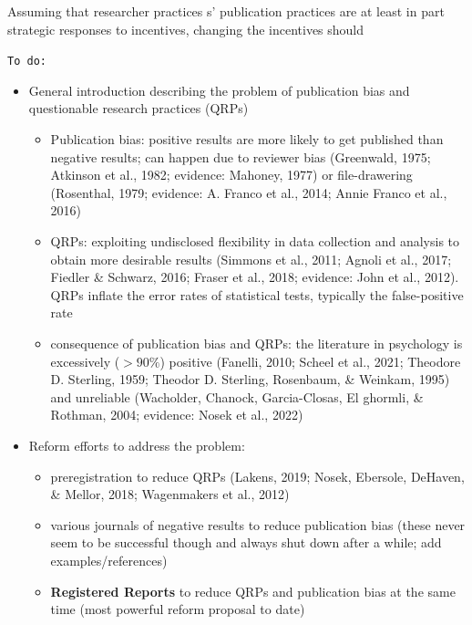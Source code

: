 \documentclass[
  ,man,mask,floatsintext]{apa6}
\providecommand{\tightlist}{%
  \setlength{\itemsep}{0pt}\setlength{\parskip}{0pt}}
\begin{document}
Assuming that researcher practices s' publication practices are at least in part strategic responses to incentives, changing the incentives should

\texttt{To\ do:}

\begin{itemize}
\tightlist
\item
  General introduction describing the problem of publication bias and questionable research practices (QRPs)

  \begin{itemize}
  \tightlist
  \item
    Publication bias: positive results are more likely to get published than negative results; can happen due to reviewer bias (Greenwald, 1975; Atkinson et al., 1982; evidence: Mahoney, 1977) or file-drawering (Rosenthal, 1979; evidence: A. Franco et al., 2014; Annie Franco et al., 2016)
  \item
    QRPs: exploiting undisclosed flexibility in data collection and analysis to obtain more desirable results (Simmons et al., 2011; Agnoli et al., 2017; Fiedler \& Schwarz, 2016; Fraser et al., 2018; evidence: John et al., 2012). QRPs inflate the error rates of statistical tests, typically the false-positive rate
  \item
    consequence of publication bias and QRPs: the literature in psychology is excessively (\(>90\%\)) positive (Fanelli, 2010; Scheel et al., 2021; Theodore D. Sterling, 1959; Theodor D. Sterling, Rosenbaum, \& Weinkam, 1995) and unreliable (Wacholder, Chanock, Garcia-Closas, El ghormli, \& Rothman, 2004; evidence: Nosek et al., 2022)
  \end{itemize}
\item
  Reform efforts to address the problem:

  \begin{itemize}
  \tightlist
  \item
    preregistration to reduce QRPs (Lakens, 2019; Nosek, Ebersole, DeHaven, \& Mellor, 2018; Wagenmakers et al., 2012)
  \item
    various journals of negative results to reduce publication bias (these never seem to be successful though and always shut down after a while; add examples/references)
  \item
    \textbf{Registered Reports} to reduce QRPs and publication bias at the same time (most powerful reform proposal to date)
  \end{itemize}
\end{itemize}
\end{document}
